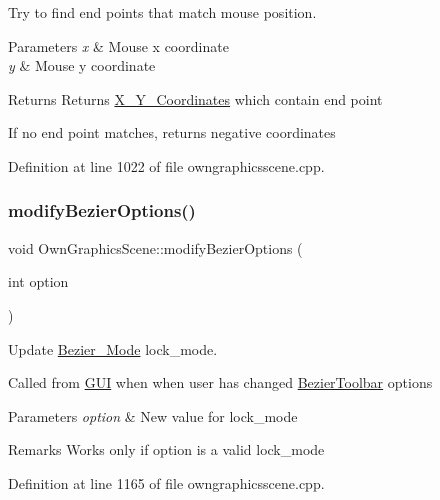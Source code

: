 Try to find end points that match mouse position. 


\begin{DoxyParams}{Parameters}
{\em x} & Mouse x coordinate \\
\hline
{\em y} & Mouse y coordinate \\
\hline
\end{DoxyParams}
\begin{DoxyReturn}{Returns}
Returns \mbox{\hyperlink{structX__Y__Coordinates}{X\+\_\+\+Y\+\_\+\+Coordinates}} which contain end point
\end{DoxyReturn}
If no end point matches, returns negative coordinates 

Definition at line 1022 of file owngraphicsscene.\+cpp.

\mbox{\label{classOwnGraphicsScene_a302a5f437c44f6fc84f9911e41172734}} 
\subsubsection{\texorpdfstring{modify\+Bezier\+Options()}{modifyBezierOptions()}}
{\footnotesize\ttfamily void Own\+Graphics\+Scene\+::modify\+Bezier\+Options (\begin{DoxyParamCaption}\item[{int}]{option }\end{DoxyParamCaption})}



Update \mbox{\hyperlink{structBezier__Mode}{Bezier\+\_\+\+Mode}} lock\+\_\+mode. 

Called from \mbox{\hyperlink{classGUI}{G\+UI}} when when user has changed \mbox{\hyperlink{structBezierToolbar}{Bezier\+Toolbar}} options 
\begin{DoxyParams}{Parameters}
{\em option} & New value for lock\+\_\+mode \\
\hline
\end{DoxyParams}
\begin{DoxyRemark}{Remarks}
Works only if option is a valid lock\+\_\+mode 
\end{DoxyRemark}


Definition at line 1165 of file owngraphicsscene.\+cpp.

\mbox{\label{classOwnGraphicsScene_adbcfda0bade866b7e5db29b7bfb53e0c}} 

